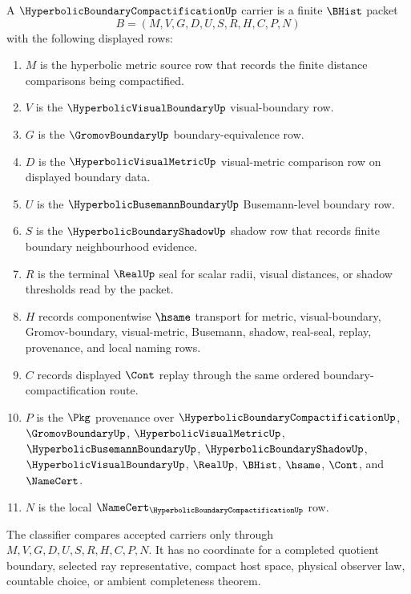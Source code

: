 \begin{definition}
\label{def:hyperbolic-boundary-compactification-carrier}
A $\HyperbolicBoundaryCompactificationUp$ carrier is a finite $\BHist$ packet
$$
B=(M,V,G,D,U,S,R,H,C,P,N)
$$
with the following displayed rows:
\begin{enumerate}
\item $M$ is the hyperbolic metric source row that records the finite distance comparisons being compactified.
\item $V$ is the $\HyperbolicVisualBoundaryUp$ visual-boundary row.
\item $G$ is the $\GromovBoundaryUp$ boundary-equivalence row.
\item $D$ is the $\HyperbolicVisualMetricUp$ visual-metric comparison row on displayed boundary data.
\item $U$ is the $\HyperbolicBusemannBoundaryUp$ Busemann-level boundary row.
\item $S$ is the $\HyperbolicBoundaryShadowUp$ shadow row that records finite boundary neighbourhood evidence.
\item $R$ is the terminal $\RealUp$ seal for scalar radii, visual distances, or shadow thresholds read by the packet.
\item $H$ records componentwise $\hsame$ transport for metric, visual-boundary, Gromov-boundary, visual-metric, Busemann, shadow, real-seal, replay, provenance, and local naming rows.
\item $C$ records displayed $\Cont$ replay through the same ordered boundary-compactification route.
\item $P$ is the $\Pkg$ provenance over $\HyperbolicBoundaryCompactificationUp$, $\GromovBoundaryUp$, $\HyperbolicVisualMetricUp$, $\HyperbolicBusemannBoundaryUp$, $\HyperbolicBoundaryShadowUp$, $\HyperbolicVisualBoundaryUp$, $\RealUp$, $\BHist$, $\hsame$, $\Cont$, and $\NameCert$.
\item $N$ is the local $\NameCert_{\HyperbolicBoundaryCompactificationUp}$ row.
\end{enumerate}
The classifier compares accepted carriers only through $M,V,G,D,U,S,R,H,C,P,N$. It has no coordinate for a completed quotient boundary, selected ray representative, compact host space, physical observer law, countable choice, or ambient completeness theorem.
\end{definition}

